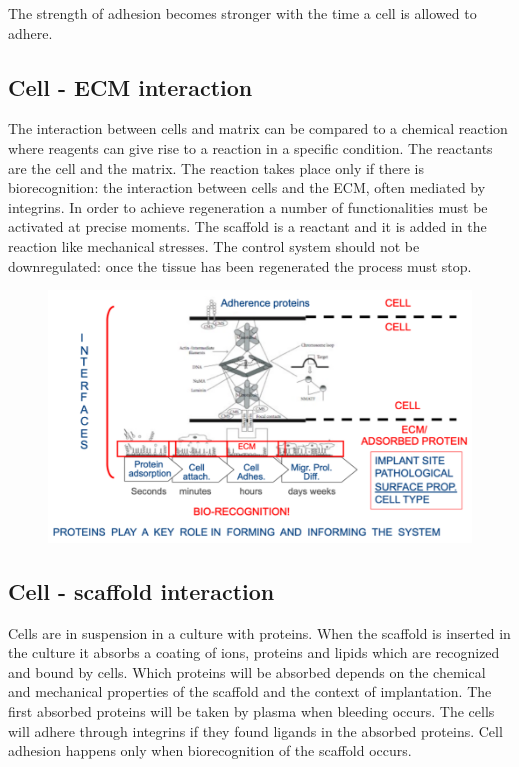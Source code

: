 		The strength of adhesion becomes stronger with the time a cell is allowed to adhere.

	\subsection{Cell - ECM interaction}
	The interaction between cells and matrix can be compared to a chemical reaction where reagents can give rise to a reaction in a specific condition.
	The reactants are the cell and the matrix.
	The reaction takes place only if there is biorecognition: the interaction between cells and the ECM, often mediated by integrins.
	In order to achieve regeneration a number of functionalities must be activated at precise moments.
	The scaffold is a reactant and it is added in the reaction like mechanical stresses.
	The control system should not be downregulated: once the tissue has been regenerated the process must stop.

	\begin{figure}[h]
	\includegraphics[width=1\textwidth]{interfaces}
	\caption{\label{fig:interfaces}}
	\end{figure}

	\subsection{Cell - scaffold interaction}
	Cells are in suspension in a culture with proteins.
	When the scaffold is inserted in the culture it absorbs a coating of ions, proteins and lipids which are recognized and bound by cells.
	Which proteins will be absorbed depends on the chemical and mechanical properties of the scaffold and the context of implantation.
	The first absorbed proteins will be taken by plasma when bleeding occurs.
	The cells will adhere through integrins if they found ligands in the absorbed proteins.
	Cell adhesion happens only when biorecognition of the scaffold occurs.

